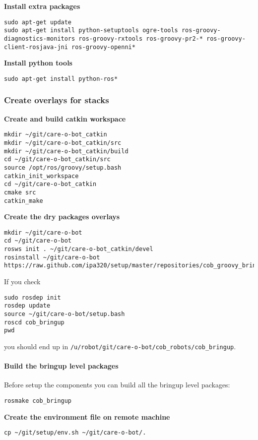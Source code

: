 \textbf{Install extra packages}
\begin{lstlisting}
sudo apt-get update
sudo apt-get install python-setuptools ogre-tools ros-groovy-diagnostics-monitors ros-groovy-rxtools ros-groovy-pr2-* ros-groovy-client-rosjava-jni ros-groovy-openni*
\end{lstlisting}

\textbf{Install python tools}
\begin{lstlisting}
sudo apt-get install python-ros*
\end{lstlisting}

\subsubsection{Create overlays for stacks}
\textbf{Create and build  catkin workspace}
\begin{lstlisting}
mkdir ~/git/care-o-bot_catkin
mkdir ~/git/care-o-bot_catkin/src
mkdir ~/git/care-o-bot_catkin/build
cd ~/git/care-o-bot_catkin/src
source /opt/ros/groovy/setup.bash
catkin_init_workspace
cd ~/git/care-o-bot_catkin
cmake src
catkin_make
\end{lstlisting}

\textbf{Create the dry packages overlays}
\begin{lstlisting}
mkdir ~/git/care-o-bot
cd ~/git/care-o-bot
rosws init . ~/git/care-o-bot_catkin/devel
rosinstall ~/git/care-o-bot https://raw.github.com/ipa320/setup/master/repositories/cob_groovy_bringup.rosinstall
\end{lstlisting}

If you check 
\begin{lstlisting}
sudo rosdep init
rosdep update
source ~/git/care-o-bot/setup.bash
roscd cob_bringup
pwd
\end{lstlisting}
you should end up in \texttt{/u/robot/git/care-o-bot/cob\_robots/cob\_bringup}.

\paragraph{Build the bringup level packages}
Before setup the components you can build all the bringup level packages:
\begin{lstlisting}
rosmake cob_bringup
\end{lstlisting}

\textbf{Create the environment file on remote machine}
\begin{lstlisting}
cp ~/git/setup/env.sh ~/git/care-o-bot/.
\end{lstlisting}



